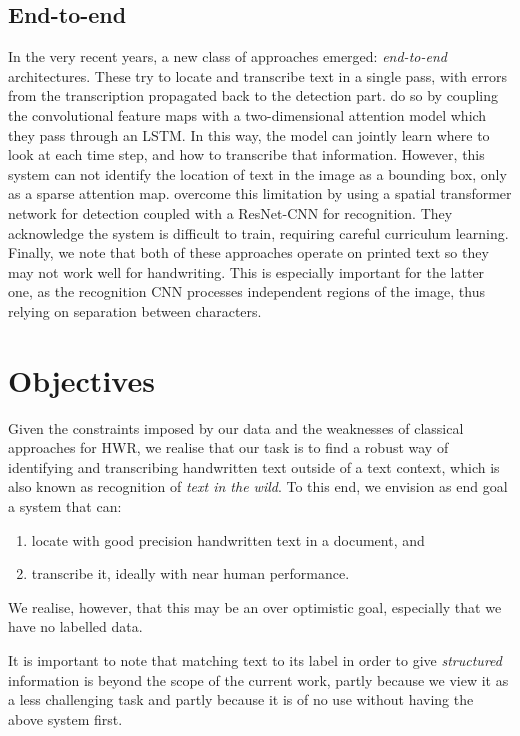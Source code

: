 
	\subsection{End-to-end}\label{sec:related_e2e}
		In the very recent years, a new class of approaches emerged: \emph{end-to-end} architectures. These try to locate and transcribe text in a single pass, with errors from the transcription propagated back to the detection part.  do so by coupling the convolutional feature maps with a two-dimensional attention model which they pass through an LSTM. In this way, the model can jointly learn where to look at each time step, and how to transcribe that information. However, this system can not identify the location of text in the image as a bounding box, only as a sparse attention map.  overcome this limitation by using a spatial transformer network \citep{stn} for detection coupled with a ResNet-CNN for recognition. They acknowledge the system is difficult to train, requiring careful curriculum learning. Finally, we note that both of these approaches operate on printed text so they may not work well for handwriting. This is especially important for the latter one, as the recognition CNN processes independent regions of the image, thus relying on separation between characters.





\section{Objectives}

	Given the constraints imposed by our data and the weaknesses of classical approaches for HWR, we realise that our task is to find a robust way of identifying and transcribing handwritten text outside of a text context, which is also known as recognition of \emph{text in the wild}. To this end, we envision as end goal a system that can:
	\begin{enumerate}
	 	\item locate with good precision handwritten text in a document, and
	 	\item transcribe it, ideally with near human performance.
	\end{enumerate}
	We realise, however, that this may be an over optimistic goal, especially that we have no labelled data.

	It is important to note that matching text to its label in order to give \emph{structured} information is beyond the scope of the current work, partly because we view it as a less challenging task and partly because it is of no use without having the above system first.




